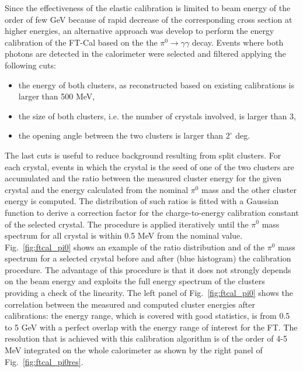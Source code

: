 Since the effectiveness of the elastic calibration is limited to beam energy of the order of few GeV because of rapid decrease of the corresponding cross section at higher energies, an alternative approach was develop to perform the energy calibration of the FT-Cal based on the the $\pi^0\to\gamma\gamma$ decay. Events where both photons are detected in the calorimeter were selected and filtered applying the following cuts:
\begin{itemize}
    \item the energy of both clusters, as reconstructed based on existing calibrations is larger than 500 MeV,
    \item the size of both clusters, i.e. the number of crystals involved, is larger than 3,
    \item the opening angle between the two clusters is larger than $2^\circ$ deg.
\end{itemize}
The last cuts is useful to reduce background resulting from split clusters.  For each crystal, events in which the crystal is the seed of one of the two clusters are accumulated and the ratio between the measured cluster energy for the given crystal and the energy calculated from the nominal $\pi^0$ mass and the other cluster energy is computed. The distribution of such ratios is fitted with a Gaussian function to derive a correction factor for the charge-to-energy calibration constant of the selected crystal. The procedure is applied iteratively until the $\pi^0$ mass spectrum for all crystal is within 0.5 MeV from the nominal value. Fig.~\ref{fig:ftcal_pi0} shows an example of the ratio distribution and of the $\pi^0$ mass spectrum for a selected crystal before and after (blue histogram) the calibration procedure. The advantage of this procedure is that it does not strongly depends on the beam energy and exploits the full energy spectrum of the clusters providing a check of the linearity. The left panel of Fig.~\ref{fig:ftcal_pi0} shows the  correlation between the measured and computed cluster energies after calibrations: the energy range, which is covered with good statistics, is from 0.5 to 5 GeV with a perfect overlap with the energy range of interest for the FT. The resolution that is achieved with this calibration algorithm is of the order of 4-5 MeV integrated  on the whole calorimeter as  shown by the right panel of Fig.~\ref{fig:ftcal_pi0res}.

